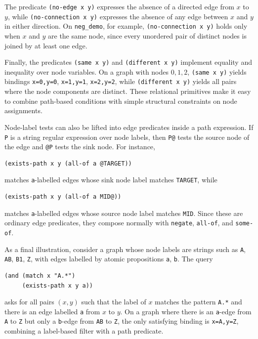 \documentclass[11pt]{article}
\begin{document}
The predicate \texttt{(no-edge x y)} expresses the absence of a directed edge from $x$ to $y$, while \texttt{(no-connection x y)} expresses the absence of any edge between $x$ and $y$ in either direction. On \texttt{neg\_demo}, for example, \texttt{(no-connection x y)} holds only when $x$ and $y$ are the same node, since every unordered pair of distinct nodes is joined by at least one edge.

Finally, the predicates \texttt{(same x y)} and \texttt{(different x y)} implement equality and inequality over node variables. On a graph with nodes $0,1,2$, \texttt{(same x y)} yields bindings \texttt{x=0,y=0}, \texttt{x=1,y=1}, \texttt{x=2,y=2}, while \texttt{(different x y)} yields all pairs where the node components are distinct. These relational primitives make it easy to combine path-based conditions with simple structural constraints on node assignments.

Node-label tests can also be lifted into edge predicates inside a path expression. If \texttt{P} is a string regular expression over node labels, then \texttt{P@} tests the source node of the edge and \texttt{@P} tests the sink node. For instance,
\begin{verbatim}
(exists-path x y (all-of a @TARGET))
\end{verbatim}
matches \texttt{a}-labelled edges whose sink node label matches \texttt{TARGET}, while
\begin{verbatim}
(exists-path x y (all-of a MID@))
\end{verbatim}
matches \texttt{a}-labelled edges whose source node label matches \texttt{MID}. Since these are ordinary edge predicates, they compose normally with \texttt{negate}, \texttt{all-of}, and \texttt{some-of}.

As a final illustration, consider a graph whose node labels are strings such as \texttt{A}, \texttt{AB}, \texttt{B1}, \texttt{Z}, with edges labelled by atomic propositions \texttt{a}, \texttt{b}. The query
\begin{verbatim}
(and (match x "A.*")
     (exists-path x y a))
\end{verbatim}
asks for all pairs $(x,y)$ such that the label of $x$ matches the pattern \texttt{A.*} and there is an edge labelled \texttt{a} from $x$ to $y$. On a graph where there is an \texttt{a}-edge from \texttt{A} to \texttt{Z} but only a \texttt{b}-edge from \texttt{AB} to \texttt{Z}, the only satisfying binding is \texttt{x=A,y=Z}, combining a label-based filter with a path predicate.
\end{document}
